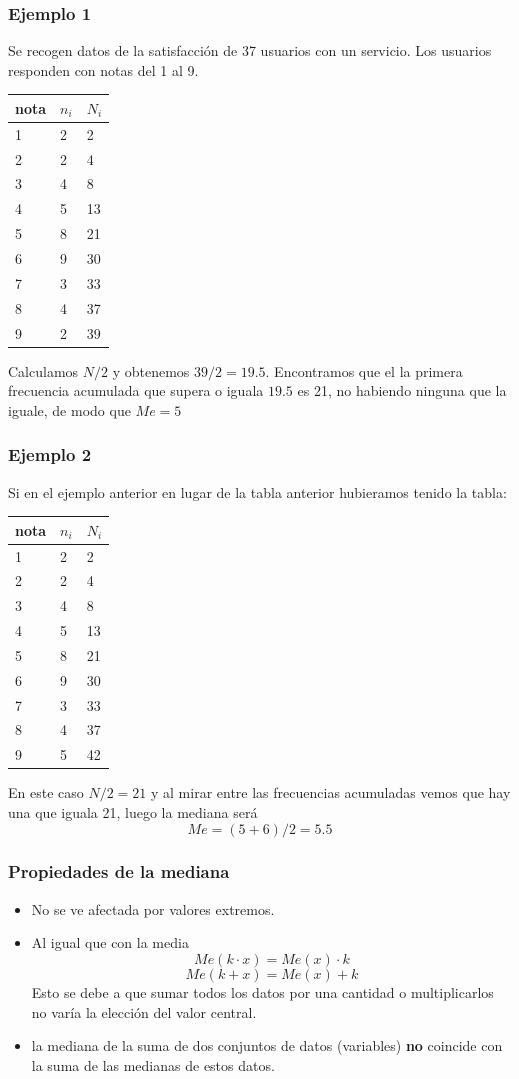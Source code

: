 \documentclass[
]{article}
\providecommand{\tightlist}{%
  \setlength{\itemsep}{0pt}\setlength{\parskip}{0pt}}
\begin{document}
\hypertarget{ejemplo-1-1}{%
\subsubsection{Ejemplo 1}\label{ejemplo-1-1}}

Se recogen datos de la satisfacción de 37 usuarios con un servicio. Los
usuarios responden con notas del 1 al 9.

\begin{longtable}[]{@{}lll@{}}
\toprule
nota & \(n_i\) & \(N_i\)\tabularnewline
\midrule
\endhead
1 & 2 & 2\tabularnewline
2 & 2 & 4\tabularnewline
3 & 4 & 8\tabularnewline
4 & 5 & 13\tabularnewline
5 & 8 & 21\tabularnewline
6 & 9 & 30\tabularnewline
7 & 3 & 33\tabularnewline
8 & 4 & 37\tabularnewline
9 & 2 & 39\tabularnewline
\bottomrule
\end{longtable}

Calculamos \(N/2\) y obtenemos \(39/2 = 19.5\). Encontramos que el la
primera frecuencia acumulada que supera o iguala \(19.5\) es 21, no
habiendo ninguna que la iguale, de modo que \(Me = 5\)

\hypertarget{ejemplo-2-1}{%
\subsubsection{Ejemplo 2}\label{ejemplo-2-1}}

Si en el ejemplo anterior en lugar de la tabla anterior hubieramos
tenido la tabla:

\begin{longtable}[]{@{}lll@{}}
\toprule
nota & \(n_i\) & \(N_i\)\tabularnewline
\midrule
\endhead
1 & 2 & 2\tabularnewline
2 & 2 & 4\tabularnewline
3 & 4 & 8\tabularnewline
4 & 5 & 13\tabularnewline
5 & 8 & 21\tabularnewline
6 & 9 & 30\tabularnewline
7 & 3 & 33\tabularnewline
8 & 4 & 37\tabularnewline
9 & 5 & 42\tabularnewline
\bottomrule
\end{longtable}

En este caso \(N/2= 21\) y al mirar entre las frecuencias acumuladas
vemos que hay una que iguala 21, luego la mediana será
\[Me = (5+6)/2 = 5.5\]

\hypertarget{propiedades-de-la-mediana}{%
\subsubsection{Propiedades de la
mediana}\label{propiedades-de-la-mediana}}

\begin{itemize}
\tightlist
\item
  No se ve afectada por valores extremos.
\item
  Al igual que con la media \[Me(k\cdot x) = Me(x) \cdot k\]
  \[Me(k+ x) = Me(x) + k\] Esto se debe a que sumar todos los datos por
  una cantidad o multiplicarlos no varía la elección del valor central.
\item
  la mediana de la suma de dos conjuntos de datos (variables)
  \textbf{no} coincide con la suma de las medianas de estos datos.
\end{itemize}
\end{document}
